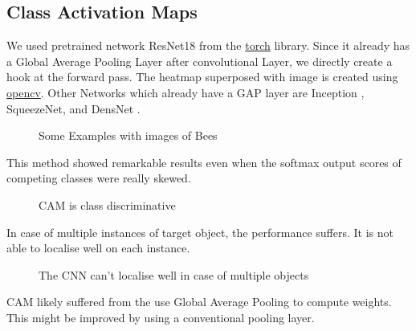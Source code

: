 \subsection{Class Activation Maps}
We used pretrained network ResNet18 \cite{ResNet} from the \href{https://pytorch.org/}{torch} library. 
Since it already has a Global Average Pooling Layer after convolutional Layer, we directly create a hook at the forward pass. The heatmap superposed with image is created using \href{https://opencv.org/}{opencv}.
Other Networks which already have a GAP layer are Inception \cite{Inception}, SqueezeNet\cite{SqueezeNet}, and DensNet \cite{DensNet}.\\

\begin{figure}[H]
    \centering
    \qquad
    \caption[Short text]{Some Examples with images of Bees}
    \label{fig:Some_Examples}
\end{figure}
This method showed remarkable results even when the softmax output scores of competing classes were really skewed.

\begin{figure}[H]
    \centering
    \qquad
    \qquad
    \qquad
    \caption[Short text]{CAM is class discriminative}
    \label{fig:Defi}
\end{figure}

In case of multiple instances of target object, the performance suffers. It is not able to localise well on each instance.

\begin{figure}[H]
    \centering
    \qquad
    \caption[Short text]{The CNN can't localise well in case of multiple objects}
    \label{fig:Defi}
\end{figure}

CAM likely suffered from the use Global Average Pooling to compute weights. This might be improved by using a conventional pooling layer.   